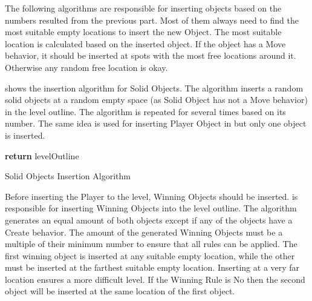 The following algorithms are responsible for inserting objects based on the numbers resulted from the previous part. Most of them always need to find the most suitable empty locations to insert the new Object. The most suitable location is calculated based on the inserted object. If the object has a Move behavior, it should be inserted at spots with the most free locations around it. Otherwise any random free location is okay.\\\par

 shows the insertion algorithm for Solid Objects. The algorithm inserts a random solid objects at a random empty space (as Solid Object has not a Move behavior) in the level outline. The algorithm is repeated for several times based on its number. The same idea is used for inserting Player Object in  but only one object is inserted.\\

\begin{algorithm}[H]
	\BlankLine
	\BlankLine
	\textbf{return} levelOutline\;
	\caption{Solid Objects Insertion Algorithm}
	\label{Algorithm:solidObjects}
\end{algorithm}

Before inserting the Player to the level, Winning Objects should be inserted.  is responsible for inserting Winning Objects into the level outline. The algorithm generates an equal amount of both objects except if any of the objects have a Create behavior. The amount of the generated Winning Objects must be a multiple of their minimum number to ensure that all rules can be applied. The first winning object is inserted at any suitable empty location, while the other must be inserted at the farthest suitable empty location. Inserting at a very far location ensures a more difficult level. If the Winning Rule is No then the second object will be inserted at the same location of the first object.\\

